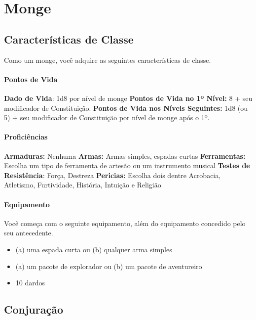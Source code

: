 \chapter{Monge}%
\label{cha:monge}
\begin{multicols}{2}

\section*{Características de Classe}%

Como um monge, você adquire as seguintes características de classe.

\subsubsection{Pontos de Vida}%

\noindent\textbf{Dado de Vida}: 1d8 por nível de monge \nl
\textbf{Pontos de Vida no 1º Nível:} 8 + seu modificador de Constituição. \nl
\textbf{Pontos de Vida nos Níveis Seguintes:} 1d8 (ou 5) + seu modificador de
Constituição por nível de monge após o 1º.

\subsubsection{Proficiências}%

\noindent\textbf{Armaduras:} Nenhuma \nl
\textbf{Armas:} Armas simples, espadas curtas \nl
\textbf{Ferramentas:} Escolha um tipo de ferramenta de artesão ou um instrumento
musical \jump
\textbf{Testes de Resistência}: Força, Destreza \nl
\textbf{Pericias:} Escolha dois dentre Acrobacia, Atletismo, Furtividade,
História, Intuição e Religião

\subsubsection{Equipamento}%

Você começa com o seguinte equipamento, além do equipamento concedido pelo seu
antecedente.
\begin{itemize}
    \item (a) uma espada curta ou (b) qualquer arma simples
    \item (a) um pacote de explorador ou (b) um pacote de aventureiro
    \item 10 dardos
\end{itemize}

\section*{Conjuração}%


\end{multicols}
